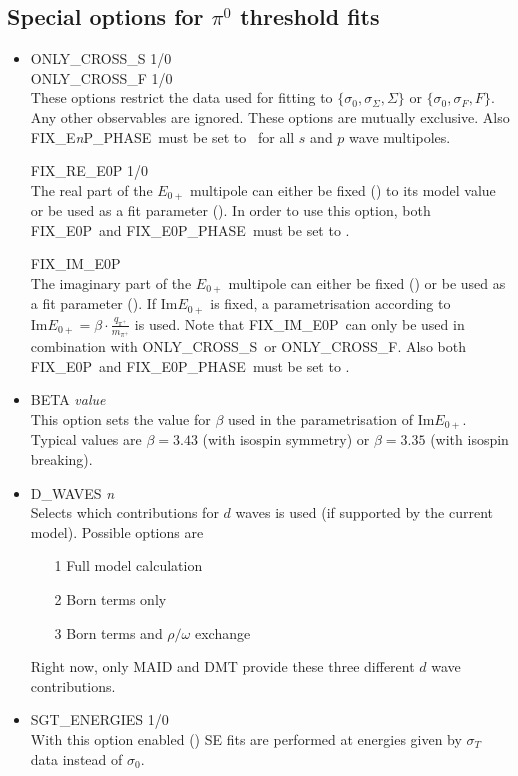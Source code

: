 \documentclass[a4paper,10pt]{article}
\def\Im{\mathrm{Im}}
\def\tt{\ttfamily}
\def\rm{\rmfamily}
\begin{document}
\subsection{Special options for $\pi^0$ threshold fits}

\begin{itemize}
\item
\tt ONLY\_CROSS\_S 1/0\rm\\
\tt ONLY\_CROSS\_F 1/0\rm\\
These options restrict the data used for fitting to $\lbrace\sigma_0,\sigma_\Sigma, \Sigma\rbrace$ or
$\lbrace\sigma_0,\sigma_F, F\rbrace$. Any other observables are ignored.
These options are mutually exclusive. Also \tt FIX\_E\textit{n}P\_PHASE\rm\ must be set to \tt0\rm\
for all $s$ and $p$ wave multipoles.

\tt FIX\_RE\_E0P 1/0\rm\\
The real part of the $E_{0+}$ multipole can either be fixed (\tt1\rm) to its model value or be used as a fit parameter (\tt0\rm).
In order to use this option, both \tt FIX\_E0P\rm\ and \tt FIX\_E0P\_PHASE\rm\ must be set to \tt0\rm.

\tt FIX\_IM\_E0P\rm\\
The imaginary part of the $E_{0+}$ multipole can either be fixed (\tt1\rm) or be used as a fit parameter (\tt0\rm). If $\Im E_{0+}$
is fixed, a parametrisation according to $\Im E_{0+} = \beta \cdot \frac{q_{\pi^+}}{m_{\pi^+}}$ is used.
Note that \tt FIX\_IM\_E0P\rm\ can only be used in combination with \tt ONLY\_CROSS\_S\rm\
or \tt ONLY\_CROSS\_F\rm. Also 
both \tt FIX\_E0P\rm\ and \tt FIX\_E0P\_PHASE\rm\ must be set to \tt0\rm.

\item
\tt BETA \textit{value}\rm\\
This option sets the value for $\beta$ used in the parametrisation of $\Im E_{0+}$. Typical values are
$\beta = 3.43$ (with isospin symmetry) or $\beta = 3.35$ (with isospin breaking).

\item
\tt D\_WAVES \textit{n}\rm\\
Selects which contributions for $d$ waves is used (if supported by the current model). Possible options are
\vspace{-0.5em}\begin{enumerate}
\item[1\:\:] Full model calculation
\item[2\:\:] Born terms only
\item[3\:\:] Born terms and $\rho/\omega$ exchange
\end{enumerate}
\vspace{-0.5em}Right now, only MAID and DMT provide these three different $d$ wave contributions.

\item
\tt SGT\_ENERGIES 1/0\rm\\
With this option enabled (\tt1\rm) SE fits are performed at energies given by $\sigma_T$ data instead of $\sigma_0$.
\end{itemize}
\end{document}
